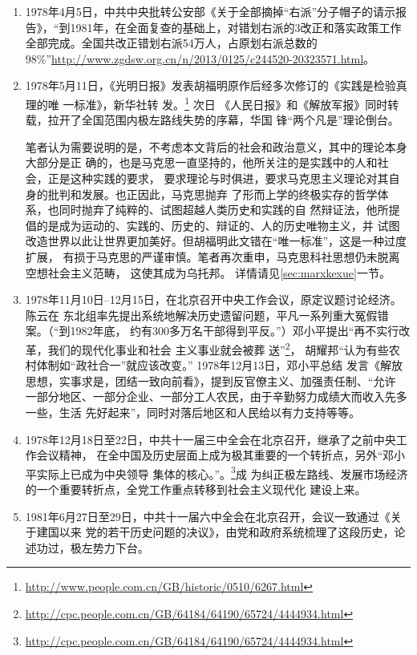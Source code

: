 \begin{enumerate}
\item 1978年4月5日，中共中央批转公安部《关于全部摘掉“右派”分子帽子的请示报告》，“到1981年，在全面复查的基础上，对错划右派的3改正和落实政策工作全部完成。全国共改正错划右派54万人，占原划右派总数的98\%”\url{http://www.zgdsw.org.cn/n/2013/0125/c244520-20323571.html}。

\item 1978年5月11日，《光明日报》发表胡福明原作后经多次修订的《实践是检验真理的唯
  一标准》，新华社转
  发。\footnote{\url{http://www.people.com.cn/GB/historic/0510/6267.html}} 次日
  《人民日报》和《解放军报》同时转载，拉开了全国范围内极左路线失势的序幕，华国
  锋“两个凡是”理论倒台。

  笔者认为需要说明的是，不考虑本文背后的社会和政治意义，其中的理论本身大部分是正
  确的，也是马克思一直坚持的，他所关注的是实践中的人和社会，正是这种实践的要求，
  要求理论与时俱进，要求马克思主义理论对其自身的批判和发展。也正因此，马克思抛弃
  了形而上学的终极实存的哲学体系，也同时抛弃了纯粹的、试图超越人类历史和实践的自
  然辩证法，他所提倡的是成为运动的、实践的、历史的、辩证的、人的历史唯物主义，并
  试图改造世界以此让世界更加美好。但胡福明此文错在“唯一标准”，这是一种过度扩展，
  有损于马克思的严谨审慎。笔者再次重申，马克思科社思想仍未脱离空想社会主义范畴，
  这使其成为乌托邦。
  详情请见\cref{sec:marxkexue}一节。

\item 1978年11月10日--12月15日，在北京召开中央工作会议，原定议题讨论经济。陈云在
  东北组率先提出系统地解决历史遗留问题，平凡一系列重大冤假错案。（“到1982年底，
  约有300多万名干部得到平反。”）邓小平提出“再不实行改革，我们的现代化事业和社会
  主义事业就会被葬
  送”\footnote{\url{http://cpc.people.com.cn/GB/64184/64190/65724/4444934.html}}，
  胡耀邦“认为有些农村体制如“政社合一”就应该改变。” 1978年12月13日，邓小平总结
  发言《解放思想，实事求是，团结一致向前看》，提到反官僚主义、加强责任制、“允许
  一部分地区、一部分企业、一部分工人农民，由于辛勤努力成绩大而收入先多一些，生活
  先好起来”，同时对落后地区和人民给以有力支持等等。

\item 1978年12月18日至22日，中共十一届三中全会在北京召开，继承了之前中央工作会议精神，
  在全中国及历史层面上成为极其重要的一个转折点，另外“邓小平实际上已成为中央领导
  集体的核心。”。\footnote{\url{http://cpc.people.com.cn/GB/64184/64190/65724/4444934.html}}成
  为纠正极左路线、发展市场经济的一个重要转折点，全党工作重点转移到社会主义现代化
  建设上来。

\item 1981年6月27日至29日，中共十一届六中全会在北京召开，会议一致通过《关于建国以来
  党的若干历史问题的决议》，由党和政府系统梳理了这段历史，论述功过，极左势力下台。



\end{enumerate}
